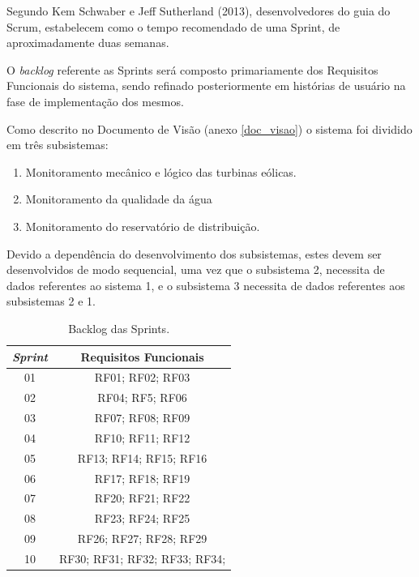 	Segundo Kem Schwaber e Jeff Sutherland (2013), desenvolvedores do
	guia do Scrum, estabelecem como o tempo recomendado de uma Sprint, de
	aproximadamente duas semanas.
	
	O \textit{backlog} referente as Sprints será composto primariamente dos
	Requisitos Funcionais do sistema, sendo refinado posteriormente em histórias
	de usuário na fase de implementação dos mesmos.
	
	Como descrito no Documento de Visão (anexo \ref{doc_visao}) o sistema foi dividido em três
	subsistemas:
	
	\begin{enumerate}
	 \item Monitoramento mecânico e lógico das turbinas eólicas.
	 \item Monitoramento da qualidade da água
	 \item Monitoramento do reservatório de distribuição.
	\end{enumerate}
	
	Devido a dependência do desenvolvimento dos subsistemas, estes
	devem ser desenvolvidos de modo sequencial, uma vez que o subsistema 2,
	necessita de dados referentes ao sistema 1, e o subsistema 3 necessita de
	dados referentes aos subsistemas 2 e 1.
	
	\begin{table}[h]
	  \centering
	  \begin{tabular}{|c|c|}

	  \hline
	  \textit{\textbf{Sprint}} & \textbf{Requisitos Funcionais}\\
	  \hline
	    01 & RF01; RF02; RF03\\
	    \hline
	    02 & RF04; RF5; RF06\\
	    \hline
	    03 & RF07; RF08; RF09\\
	    \hline
	    04 & RF10; RF11; RF12\\
	    \hline
	    05 & RF13; RF14; RF15; RF16\\
	    \hline
	    06 & RF17; RF18; RF19\\
	    \hline
	    07 & RF20; RF21; RF22\\
	    \hline
	    08 & RF23; RF24; RF25\\
	    \hline
	    09 & RF26; RF27; RF28; RF29\\
	    \hline
	    10 & RF30; RF31; RF32; RF33; RF34;\\
	    \hline
	  \end{tabular}
	  \caption[Backlog das Sprints]{Backlog das Sprints.}
	\end{table}
	
